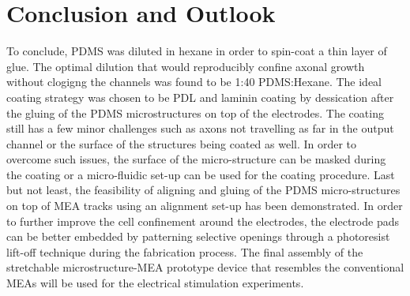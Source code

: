 \chapter{Conclusion and Outlook}
\label{ch:conclusionOutlook}



To conclude, PDMS was diluted in hexane in order to spin-coat a thin layer of glue. The optimal dilution that would reproducibly confine axonal growth without clogigng the channels was found to be 1:40 PDMS:Hexane. The ideal coating strategy was chosen to be PDL and laminin coating by dessication after the gluing of the PDMS microstructures on top of the electrodes. The coating still has a few minor challenges such as axons not travelling as far in the output channel or the surface of the structures being coated as well. In order to overcome such issues, the surface of the micro-structure can be masked during the coating or a micro-fluidic set-up can be used for the coating procedure. Last but not least, the feasibility of aligning and gluing of the PDMS micro-structures on top of MEA tracks using an alignment set-up has been demonstrated. In order to further improve the cell confinement around the electrodes, the electrode pads can be better embedded by patterning selective openings through a photoresist lift-off technique during the fabrication process. The final assembly of the stretchable microstructure-MEA prototype device that resembles the conventional MEAs will be used for the electrical stimulation experiments.

















\label{ch:conclusionOutlook:sec:shortComings}

